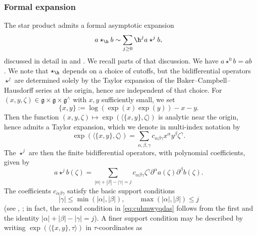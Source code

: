 \subsubsection{Formal expansion}\label{sec:formal-expansion}
The star product admits a formal asymptotic expansion  
\begin{equation*}
  a \star_{\h} b \sim \sum_{j \geq 0} \h^j a \star^j b,
\end{equation*}
discussed in detail in \cite[\S4.2, \S4.6]{nelson-venkatesh-1} and \cite[\S9.2]{2020arXiv201202187N}.  We recall parts of that discussion.  We have $a \star^0 b = ab$.  We note that $\star_{\h}$ depends on a choice of cutoffs, but the bidifferential operators $\star^j$ are determined solely by the Taylor expansion of the Baker--Campbell--Hausdorff series at the origin, hence are independent of that choice.  For $(x,y,\zeta) \in \mathfrak{g} \times \mathfrak{g} \times \mathfrak{g}^\wedge$ with $x,y$ sufficiently small, we set
\begin{equation*}
  \{x,y\} := \log(\exp(x) \exp(y)) - x - y.
\end{equation*}
Then the function $(x,y,\zeta) \mapsto \exp (\langle \{x, y\}, \zeta  \rangle)$ is analytic near the origin, hence admits a Taylor expansion, which we denote in multi-index notation by
\begin{equation*}
  \exp (\langle \{x, y\}, \zeta  \rangle)
  = \sum_{\alpha, \beta , \gamma } c_{\alpha \beta \gamma } x^\alpha y^\beta \zeta^\gamma.
\end{equation*}
The $\star^j$ are then the finite bidifferential operators, with polynomial coefficients, given by
\begin{equation*}
  a \star^j b(\zeta) = \sum  _{|\alpha| + |\beta| - |\gamma| = j} c_{\alpha \beta \gamma} \zeta^\gamma \partial^\alpha a(\zeta) \partial^\beta b(\zeta).
\end{equation*}
The coefficients $c_{\alpha \beta \gamma}$ satisfy the basic support conditions
\begin{equation}\label{eq:cuhmwyqdas}
  |\gamma| \leq \min(|\alpha|,|\beta|), \qquad  \max(\lvert \alpha \rvert, \lvert \beta \rvert) \leq j
\end{equation}
(see \cite[(4.5)]{nelson-venkatesh-1}, \cite[(9.3)]{2020arXiv201202187N}; in fact, the second condition in \eqref{eq:cuhmwyqdas} follows from the first and the identity $\lvert \alpha \rvert + \lvert \beta \rvert - \lvert \gamma \rvert = j$).  A finer support condition may be described by writing $\exp (\langle \{x, y\}, \tau  \rangle)$ in $\tau$-coordinates as
